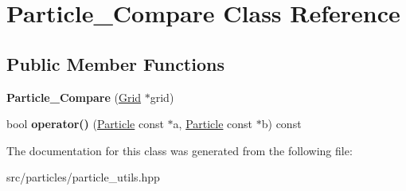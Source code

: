 \hypertarget{class_particle___compare}{}\section{Particle\+\_\+\+Compare Class Reference}
\label{class_particle___compare}
\subsection*{Public Member Functions}
\begin{DoxyCompactItemize}
\item 
\hypertarget{class_particle___compare_a0770365f673af7fa38e7e3cca692dbe7}{}\label{class_particle___compare_a0770365f673af7fa38e7e3cca692dbe7} 
{\bfseries Particle\+\_\+\+Compare} (\hyperlink{class_grid}{Grid} $\ast$grid)
\item 
\hypertarget{class_particle___compare_abae413d7a66c6698ccd9a6d0bda19724}{}\label{class_particle___compare_abae413d7a66c6698ccd9a6d0bda19724} 
bool {\bfseries operator()} (\hyperlink{struct_particle}{Particle} const $\ast$a, \hyperlink{struct_particle}{Particle} const $\ast$b) const
\end{DoxyCompactItemize}


The documentation for this class was generated from the following file\+:\begin{DoxyCompactItemize}
\item 
src/particles/particle\+\_\+utils.\+hpp\end{DoxyCompactItemize}
